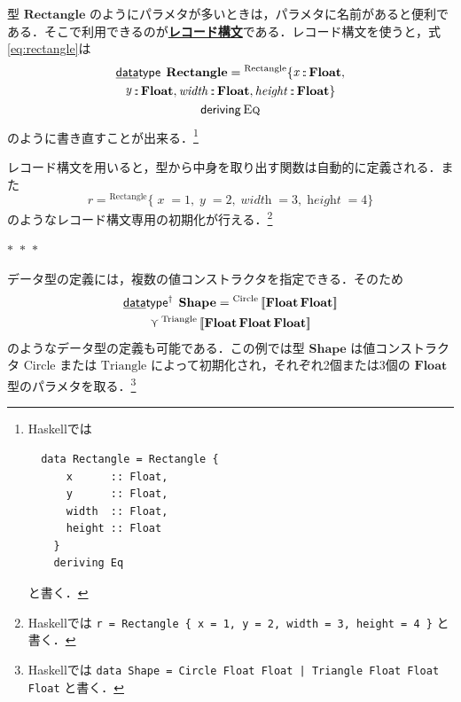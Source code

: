 \documentclass[a4paper,twocolumn]{jsbook}
\def\[{\left[\!\left[}
\def\]{\right]\!\right]}
\newcommand{\separator}{\begin{center}$*$~$*$~$*$\end{center}}
\newcommand{\programminglanguage}[1]{\textsf{#1}}
\newcommand{\haskell}{\programminglanguage{Haskell}}
\newcommand{\keyword}[1]{{\underline{\textbf{#1}}}}
\newcommand{\code}[1]{\texttt{#1}}
\newcommand{\mKeyword}[1]{\mathsf{#1}} %
\newcommand{\mKeywordUnderline}[1]{\text{\underline{\textsf{#1}}}} %
\newcommand{\mDataTypeKeyword}{\mKeywordUnderline{data}\mKeyword{type}}
\newcommand{\mDerivingKeyword}{\mKeyword{deriving}}
\DeclareMathOperator{\mDataType}{\mDataTypeKeyword}
\DeclareMathOperator{\mDataTypeParametric}{\mDataTypeKeyword^\dagger}
\DeclareMathOperator{\mDeriving}{\mDerivingKeyword}
\newcommand{\mFunc}[1]{\mathop{\mathit{#1}}}
\DeclareMathOperator{\mIn}{{:\!:}}
\DeclareMathOperator{\mValueOr}{\curlyvee}
\newcommand{\mType}[1]{\mathbf{#1}}
\newcommand{\mFloatType}{\mType{Float}}
\newcommand{\mGenericValueConstructor}[1]{\mathrm{#1}}
\newcommand{\mGenericWith}[2]{{}^\mGenericValueConstructor{#1}\[#2\]}
\newcommand{\mGenericRecordWith}[2]{{}^\mGenericValueConstructor{#1}\{#2\}}
\newcommand{\mGenericRecordBeginWith}[1]{{}^\mGenericValueConstructor{#1}\{}
\newcommand{\mGenericRecordEnd}{\}}
\newcommand{\mGenericTypeClass}[1]{\textsc{#1}} %
\newcommand{\mEqTypeClass}{\mGenericTypeClass{Eq}}
\begin{document}
型 $\mType{Rectangle}$ のようにパラメタが多いときは，パラメタに名前があると便利である．そこで利用できるのが\keyword{レコード構文}である．レコード構文を使うと，式\eqref{eq:rectangle}は
\begin{multline}
\mDataType\;
\mType{Rectangle}
=\mGenericRecordBeginWith{Rectangle}
\mFunc{x}\mIn\mFloatType,\\
\mFunc{y}\mIn\mFloatType,
\mFunc{width}\mIn\mFloatType,
\mFunc{height}\mIn\mFloatType
\mGenericRecordEnd\\
\mDeriving\mEqTypeClass
\end{multline}
のように書き直すことが出来る．\footnote{\haskell では
\begin{verbatim}
  data Rectangle = Rectangle {
      x      :: Float,
      y      :: Float,
      width  :: Float,
      height :: Float
    }
    deriving Eq
\end{verbatim}
と書く．}

レコード構文を用いると，型から中身を取り出す関数は自動的に定義される．また
\begin{equation}
r=\mGenericRecordWith{Rectangle}{\mFunc{x}=1,
  \mFunc{y}=2,
  \mFunc{width}=3,
  \mFunc{height}=4}
\end{equation}
のようなレコード構文専用の初期化が行える．\footnote{\haskell では \code{r = Rectangle \{ x = 1, y = 2, width = 3, height = 4 \}} と書く．}

\separator

データ型の定義には，複数の値コンストラクタを指定できる．そのため
\begin{multline}
\mDataTypeParametric\;\mType{Shape}
=\mGenericWith{Circle}{\mFloatType\,\mFloatType}\\
\mValueOr
\mGenericWith{Triangle}{\mFloatType\,\mFloatType\,\mFloatType}
\end{multline}
のようなデータ型の定義も可能である．この例では型 $\mType{Shape}$ は値コンストラクタ $\mGenericValueConstructor{Circle}$ または $\mGenericValueConstructor{Triangle}$ によって初期化され，それぞれ2個または3個の $\mFloatType$ 型のパラメタを取る．\footnote{\haskell では \code{data Shape = Circle Float Float | Triangle Float Float Float} と書く．}
\end{document}
